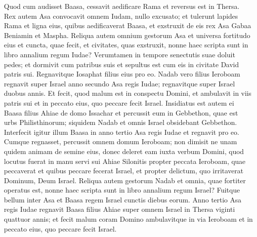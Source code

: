 \begin{biblechapter}
\begin{biblechapter}
\begin{biblechapter}
\begin{biblechapter}
\begin{biblechapter}
\begin{biblechapter}
\begin{biblechapter}
\begin{biblechapter}
\begin{biblechapter}
\begin{biblechapter}
\begin{biblechapter}
\begin{biblechapter}
\begin{biblechapter}
\begin{biblechapter}
\begin{biblechapter}
\verse Quod cum audisset Baasa, cessavit aedificare Rama et reversus est in Thersa. 
 \verse Rex autem Asa convocavit omnem Iudam, nullo excusato; et tulerunt lapides Rama et ligna eius, quibus aedificaverat Baasa, et exstruxit de eis rex Asa Gabaa Beniamin et Maspha.
 \verse Reliqua autem omnium gestorum Asa et universa fortitudo eius et cuncta, quae fecit, et civitates, quas exstruxit, nonne haec scripta sunt in libro annalium regum Iudae? Verumtamen in tempore senectutis suae doluit pedes; 
\verse et dormivit cum patribus suis et sepultus est cum eis in civitate David patris sui. Regnavitque Iosaphat filius eius pro eo.
 \verse Nadab vero filius Ieroboam regnavit super Israel anno secundo Asa regis Iudae; regnavitque super Israel duobus annis. 
\verse Et fecit, quod malum est in conspectu Domini, et ambulavit in viis patris sui et in peccato eius, quo peccare fecit Israel. 
\verse Insidiatus est autem ei Baasa filius Ahiae de domo Issachar et percussit eum in Gebbethon, quae est urbs Philisthinorum; siquidem Nadab et omnis Israel obsidebant Gebbethon. 
\verse Interfecit igitur illum Baasa in anno tertio Asa regis Iudae et regnavit pro eo. 
\verse Cumque regnasset, percussit omnem domum Ieroboam; non dimisit ne unam quidem animam de semine eius, donec deleret eam iuxta verbum Domini, quod locutus fuerat in manu servi sui Ahiae Silonitis 
\verse propter peccata Ieroboam, quae peccaverat et quibus peccare fecerat Israel, et propter delictum, quo irritaverat Dominum, Deum Israel.
 \verse Reliqua autem gestorum Nadab et omnia, quae fortiter operatus est, nonne haec scripta sunt in libro annalium regum Israel? 
\verse Fuitque bellum inter Asa et Baasa regem Israel cunctis diebus eorum.
 \verse Anno tertio Asa regis Iudae regnavit Baasa filius Ahiae super omnem Israel in Thersa viginti quattuor annis; 
\verse et fecit malum coram Domino ambulavitque in via Ieroboam et in peccato eius, quo peccare fecit Israel.
 

\end{biblechapter}
\end{biblechapter}
\end{biblechapter}
\end{biblechapter}
\end{biblechapter}
\end{biblechapter}
\end{biblechapter}
\end{biblechapter}
\end{biblechapter}
\end{biblechapter}
\end{biblechapter}
\end{biblechapter}
\end{biblechapter}
\end{biblechapter}
\end{biblechapter}
